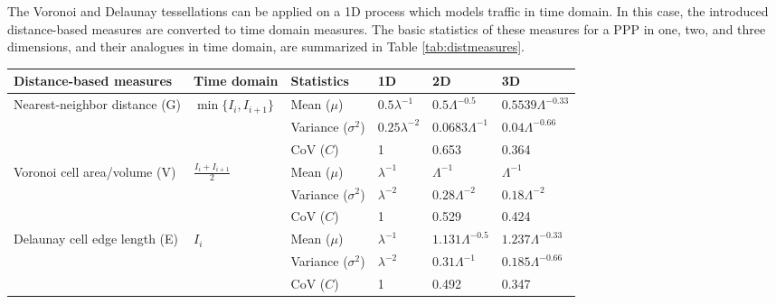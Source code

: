 \documentclass[journal]{IEEEtran}
\begin{document}
The Voronoi and Delaunay tessellations can be applied on a 1D process which models traffic in time domain. In this case, the introduced distance-based measures are converted to time domain measures. The basic statistics of these measures for a PPP in one, two, and three dimensions, and their analogues in time domain, are summarized in Table \ref{tab:distmeasures}.

\begin{table*}
\centering
\caption{}
\label{tab:distmeasures}
    \begin{tabular}{|l|l|l|l|l|l|}
    \hline
    Distance-based measures & Time domain & Statistics & 1D & 2D & 3D \\ \hline

    \multirow{3}{*}{Nearest-neighbor distance (G)} &  \multirow{3}{*}{$\min \{I_{i},I_{i+1}\}$}
		& Mean ($\mu$) & $0.5 \lambda^{-1}$ & $0.5 \Lambda^{-0.5}$ & $0.5539 \Lambda^{-0.33}$\\ 
		& & Variance ($\sigma^{2}$) & $0.25 \lambda^{-2}$ & $0.0683 \Lambda^{-1}$ & $0.04 \Lambda^{-0.66}$\\
      & & CoV ($C$) & 1 & 0.653 & 0.364\\ \hline

    \multirow{3}{*}{Voronoi cell area/volume (V)}    &  \multirow{3}{*}{$\frac{I_{i}+I_{i+1}}{2}$}   
       & Mean ($\mu$) & $\lambda^{-1}$ & $\Lambda^{-1}$ & $\Lambda^{-1}$\\
       & & Variance ($\sigma^{2}$) & $\lambda^{-2}$ & $0.28 \Lambda^{-2}$ & $0.18 \Lambda^{-2}$\\
       & & CoV ($C$) & 1 & 0.529 & 0.424\\ \hline

    \multirow{3}{*}{Delaunay cell edge length (E)}  &  \multirow{3}{*}{$I_{i}$} 
		& Mean ($\mu$) & $\lambda^{-1}$ & $1.131 \Lambda^{-0.5}$ & $1.237 \Lambda^{-0.33}$\\
      & & Variance ($\sigma^{2}$) & $\lambda^{-2}$ & $0.31 \Lambda^{-1}$ & $0.185 \Lambda^{-0.66}$\\
      & & CoV ($C$) & 1 & 0.492 & 0.347\\ \hline

    \end{tabular}
\end{table*}
\end{document}
